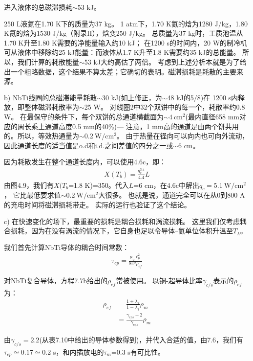 进入液体的总磁滞损耗$\sim$53 kJ。

250 L液氦在1.70 K下的质量为37 kg。
1 atm下，1.70 K氦的焓为1280 J/kg，1.80 K氦的焓为1530 J/kg（附录II），焓变250 J/kg。
总质量为37 kg时，工质池温从1.70 K升至1.80 K需要的净能量输入约10 kJ；
在1200 s的时间内，20 W的制冷机可从液体中移除约25 kJ能量：而液体从1.7 K升至1.8 K需要约35 kJ的总能量。
所以，我们计算的耗散能量$\sim$53 kJ大约高估了两倍。
考虑到上述分析本就是为了给出一个粗略数据，这个结果不算太差；它确切的表明。磁滞损耗是耗散的主要来源。

b) NbTi线圈的总磁滞能量耗散$\sim$30 kJ(如上修正，为$\sim$48 kJ的5/8)在
1200 s内释放，即整体磁滞耗散率为$\sim$25 W。
对线圈2中32个双饼中的每一个，耗散率约0.8 W。
在最保守的条件下，每个双饼的总通道横截面为$\sim 4\ \mathrm{cm^2}$(最内直径658 mm对应的周长乘上通道高度0.5 mm的40\%)---
注意，1 mm高的通道是由两个饼共用的。所以，等效热通量为$\sim 0.2\ \mathrm{W/cm^2}$。
由于热量在径向可以向内也可向外流动，因此通道长度的适当值是o.d和i.d.之间差值的四分之一或$\sim$6 cm。

因为耗散发生在整个通道长度内，可以使用4.6c，即：
\begin{align*}%
X(T_b)=\frac{q_{c}^{3.4}}{4.4}L \tag{4.6c}
\end{align*}
由图4.9，我们有$X(T_b$=1.8 K)=350。代入$L$=6 cm，在4.6c中解出$q_c=5.1\ \mathrm{W/cm^2}$，
它比最低要求值$\sim 0.2\ \mathrm{W/cm^2}$大很多。
也就是说，通道完全可以在从0到800 A的充电时间将磁滞损耗带走。
实际的运行也验证了这个结论。

c) 在快速变化的场下，最重要的损耗是耦合损耗和涡流损耗。
这里我们仅考虑耦合损耗，因为在没有涡流的情况下，它自身也足以令导体--氦单位体积升温至$T_\lambda$。

我们首先计算NbTi导体的耦合时间常数：
\begin{align*}%
\tau_{cp}=\frac{\mu_o\ell_{p}^{2}}{8\pi^2\rho_{ef}} \tag{7.6}
\end{align*}

对NbTi复合导体，方程7.7b给出的$\rho_{ef}$常被使用。
以铜-超导体比率$\gamma_{c/s}$表示的$\rho_{ef}$为：
\begin{align*}%
\rho_{ef}&=\frac{1+\lambda_f}{1-\lambda_f}\rho_{m} \\
&=\frac{\gamma_{c/s}+2}{\gamma_{c/s}}\rho_{m} \tag{S7.4}
\end{align*}

由$\gamma_{c/s}=2.2$(从表7.10中给出的导体参数得到)，并代入合适的值，由7.6，我们有$\tau_{cp}\simeq 0.17\simeq 0.2$ s，和内插放电的$\tau_m$=0.3 s有可比性。

